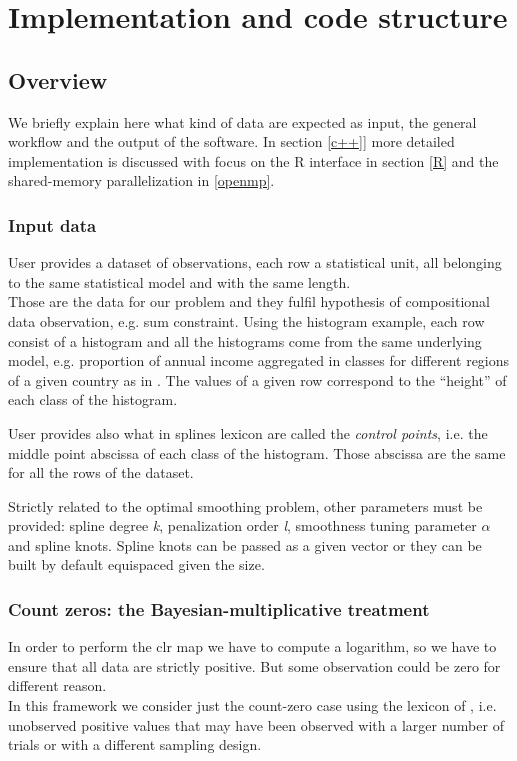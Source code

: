\chapter{Implementation and code structure}
\label{code}

\noindent 



\section{Overview}
We briefly explain here what kind of data are expected as input, the general workflow and the output of the software. In section \ref{c++}] more detailed implementation is discussed with focus on the R interface in section \ref{R} and the shared-memory parallelization in \ref{openmp}.

\subsection{Input data}
User provides a dataset of observations, each row a statistical unit, all belonging to the same statistical model and with the same length. \\
Those are the data for our problem and they fulfil hypothesis of compositional data observation, e.g. sum constraint. Using the histogram example, each row consist of a histogram and all the histograms come from the same underlying model, e.g. proportion of annual income aggregated in classes for different regions of a given country as in \cite{paper:pacs}. The values of a given row correspond to the ``height'' of each class of the histogram.

User provides also what in splines lexicon are called the \textit{control points}, i.e. the middle point abscissa of each class of the histogram. Those abscissa are the same for all the rows of the dataset.

Strictly related to the optimal smoothing problem, other parameters must be provided: spline degree \textit{k}, penalization order \textit{l}, smoothness tuning parameter \textit{$\alpha$} and spline knots. Spline knots can be passed as a given vector or they can be built by default equispaced given the size.

\subsection{Count zeros: the Bayesian-multiplicative treatment} \label{BM}
In order to perform the clr map we have to compute a logarithm, so we have to ensure that all data are strictly positive. But some observation could be zero for different reason. \\ In this framework we consider just the count-zero case using the lexicon of \cite{fernandez:zeros}, i.e. unobserved positive values that may have been observed with a larger number of trials or with a different sampling design.

